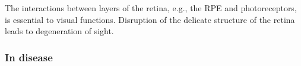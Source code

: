 \documentclass[12pt,a4paper]{journal}
\begin{document}
The interactions between layers of the retina, e.g., the RPE and photoreceptors, is essential to visual functions.
Disruption of the delicate structure of the retina leads to degeneration of sight.

\subsubsection*{In disease}


\end{document}
